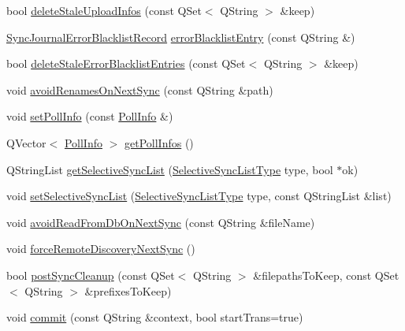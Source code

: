 \begin{DoxyCompactItemize}
bool \hyperlink{class_o_c_c_1_1_sync_journal_db_aea8fe60340218735f840cecb952b3948}{delete\+Stale\+Upload\+Infos} (const Q\+Set$<$ Q\+String $>$ \&keep)
\item 
\hyperlink{class_o_c_c_1_1_sync_journal_error_blacklist_record}{Sync\+Journal\+Error\+Blacklist\+Record} \hyperlink{class_o_c_c_1_1_sync_journal_db_a066b31be221ca33165db386208673979}{error\+Blacklist\+Entry} (const Q\+String \&)
\item 
bool \hyperlink{class_o_c_c_1_1_sync_journal_db_a16682d689dae80bff044d8c3f877cf1b}{delete\+Stale\+Error\+Blacklist\+Entries} (const Q\+Set$<$ Q\+String $>$ \&keep)
\item 
void \hyperlink{class_o_c_c_1_1_sync_journal_db_a8d5610b0467f17341f81071495d4721e}{avoid\+Renames\+On\+Next\+Sync} (const Q\+String \&path)
\item 
void \hyperlink{class_o_c_c_1_1_sync_journal_db_a9a7cc2345914fbe7b636c2d05ba2400c}{set\+Poll\+Info} (const \hyperlink{struct_o_c_c_1_1_sync_journal_db_1_1_poll_info}{Poll\+Info} \&)
\item 
Q\+Vector$<$ \hyperlink{struct_o_c_c_1_1_sync_journal_db_1_1_poll_info}{Poll\+Info} $>$ \hyperlink{class_o_c_c_1_1_sync_journal_db_adc7300cb856925824df1fa51c2dda4b4}{get\+Poll\+Infos} ()
\item 
Q\+String\+List \hyperlink{class_o_c_c_1_1_sync_journal_db_a82c108d27041377d63d12dea53ac7d00}{get\+Selective\+Sync\+List} (\hyperlink{class_o_c_c_1_1_sync_journal_db_ad028daa35155c92ce2e3863602f9feeb}{Selective\+Sync\+List\+Type} type, bool $\ast$ok)
\item 
void \hyperlink{class_o_c_c_1_1_sync_journal_db_acc27e00e5daa1643fe9c356e7c4bb34e}{set\+Selective\+Sync\+List} (\hyperlink{class_o_c_c_1_1_sync_journal_db_ad028daa35155c92ce2e3863602f9feeb}{Selective\+Sync\+List\+Type} type, const Q\+String\+List \&list)
\item 
void \hyperlink{class_o_c_c_1_1_sync_journal_db_ad4c2934c23bd1a1a66bb41cb6d928b95}{avoid\+Read\+From\+Db\+On\+Next\+Sync} (const Q\+String \&file\+Name)
\item 
void \hyperlink{class_o_c_c_1_1_sync_journal_db_ac77ec536863d991f3fe736a397f538a7}{force\+Remote\+Discovery\+Next\+Sync} ()
\item 
bool \hyperlink{class_o_c_c_1_1_sync_journal_db_ab422af01a298b8ef1ffabb4c7bc9401e}{post\+Sync\+Cleanup} (const Q\+Set$<$ Q\+String $>$ \&filepaths\+To\+Keep, const Q\+Set$<$ Q\+String $>$ \&prefixes\+To\+Keep)
\item 
void \hyperlink{class_o_c_c_1_1_sync_journal_db_abc860738e2fc503e774fbc4a1c07d0a6}{commit} (const Q\+String \&context, bool start\+Trans=true)

\end{DoxyCompactItemize}
